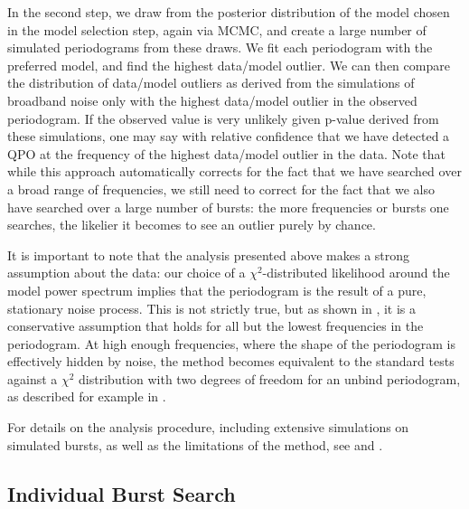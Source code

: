 \documentclass[numberedappendix]{emulateapj}
\begin{document}
In the second step, we draw from the posterior distribution of the model chosen in the model selection step, again via MCMC, and create a large number of simulated periodograms from these draws. We fit each periodogram with the preferred model, and find the highest data/model outlier. We can then compare the distribution of data/model outliers as derived from the simulations of broadband noise only with the highest data/model outlier in the observed periodogram. If the observed value is very unlikely given p-value derived from these simulations, one may say with relative confidence that we have detected a QPO at the frequency of the highest data/model outlier in the data. Note that while this approach automatically corrects for the fact that we have searched over a broad range of frequencies, we still need to correct for the fact that we also have searched over a large number of bursts: the more frequencies or bursts one searches, the likelier it becomes to see an outlier purely by chance. 

It is important to note that the analysis presented above makes a strong assumption about the data: our choice of a $\chi^2$-distributed likelihood around the model power spectrum implies that the periodogram is the result of a pure, stationary noise process. This is not strictly true, but as shown in \citet{huppenkothen13}, it is a conservative assumption that holds for all but the lowest frequencies in the periodogram. At high enough frequencies, where the shape of the periodogram is effectively hidden by noise, the method becomes equivalent to the standard tests against a $\chi^2$ distribution with two degrees of freedom for an unbind periodogram, as described for example in \citet{vanderklis1989}.

For details on the analysis procedure, including extensive simulations on simulated bursts, as well as the limitations of the method, see \citet{huppenkothen13} and \citet{vaughan2010}.

\subsection{Individual Burst Search}
\label{sec:psd_individual}
\end{document}
